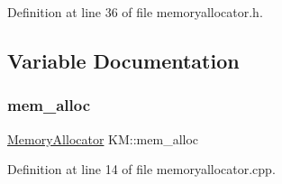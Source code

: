 Definition at line 36 of file memoryallocator.\+h.



\subsection{Variable Documentation}
\mbox{\label{namespace_k_m_ab71afb37d9950edf604f583b657905aa}} 
\subsubsection{\texorpdfstring{mem\+\_\+alloc}{mem\_alloc}}
{\footnotesize\ttfamily \hyperlink{class_k_m_1_1_memory_allocator}{Memory\+Allocator} K\+M\+::mem\+\_\+alloc}



Definition at line 14 of file memoryallocator.\+cpp.

